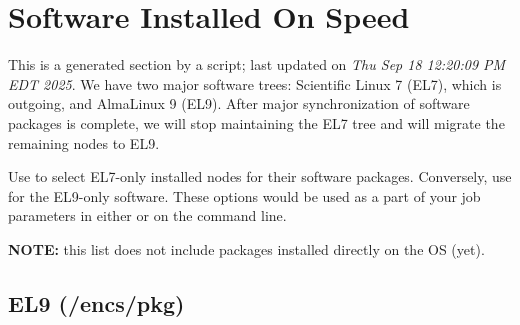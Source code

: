 \section{Software Installed On Speed}
\label{sect:software-list}

This is a generated section by a script; last updated on \textit{Thu Sep 18 12:20:09 PM EDT 2025}.
We have two major software trees: Scientific Linux 7 (EL7), which is
outgoing, and AlmaLinux 9 (EL9). After major synchronization of software
packages is complete, we will stop maintaining the EL7 tree and
will migrate the remaining nodes to EL9.

Use  to select EL7-only installed nodes for their
software packages. Conversely, use  for the EL9-only
software. These options would be used as a part of your job parameters
in either  or on the command line.

\noindent
\textbf{NOTE:} this list does not include packages installed directly on the OS (yet).
\subsection{EL9 (/encs/pkg)}
\label{sect:software-el9}

